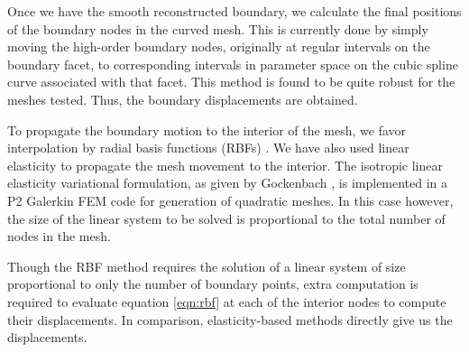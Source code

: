Once we have the smooth reconstructed boundary, we calculate the final positions of the boundary nodes in the curved mesh. This is currently done by simply moving the high-order boundary nodes, originally at regular intervals on the boundary facet, to corresponding intervals in parameter space on the cubic spline curve associated with that facet. This method is found to be quite robust for the meshes tested. Thus, the boundary displacements are obtained.

To propagate the boundary motion to the interior of the mesh, we favor interpolation by radial basis functions (RBFs) \cite{mm:rbf}. We have also used linear elasticity to propagate the mesh movement to the interior. The isotropic linear elasticity variational formulation, as given by Gockenbach \cite{gockenbach}, is implemented in a P2 Galerkin FEM code for generation of quadratic meshes. In this case however, the size of the linear system to be solved is proportional to the total number of nodes in the mesh.

Though the RBF method requires the solution of a linear system of size proportional to only the number of boundary points, extra computation is required to evaluate equation \eqref{eqn:rbf} at each of the interior nodes to compute their displacements. In comparison, elasticity-based methods directly give us the displacements.


